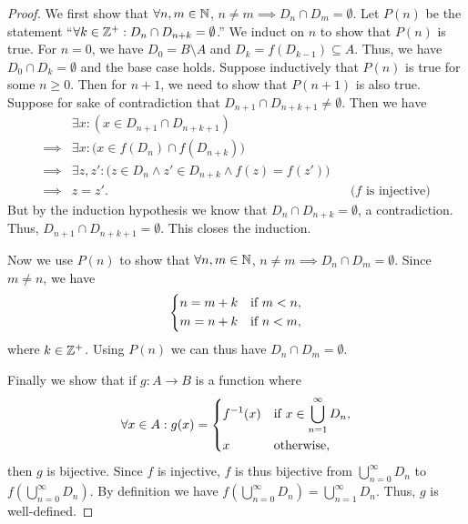 \begin{proof}
  We first show that \(\forall n, m \in \mathbb{N}\), \(n \neq m \implies D_n \cap D_m = \emptyset\).
  Let \(P(n)\) be the statement ``\(\forall k \in \mathbb{Z}^+ : D_n \cap D_{n + k} = \emptyset\).''
  We induct on \(n\) to show that \(P(n)\) is true.
  For \(n = 0\), we have \(D_0 = B \setminus A\) and \(D_k = f(D_{k - 1}) \subseteq A\).
  Thus, we have \(D_0 \cap D_k = \emptyset\) and the base case holds.
  Suppose inductively that \(P(n)\) is true for some \(n \geq 0\).
  Then for \(n + 1\), we need to show that \(P(n + 1)\) is also true.
  Suppose for sake of contradiction that \(D_{n + 1} \cap D_{n + k + 1} \neq \emptyset\).
  Then we have
  \begin{align*}
             & \exists x : (x \in D_{n + 1} \cap D_{n + k + 1})                                                               \\
    \implies & \exists x : \big(x \in f(D_n) \cap f(D_{n + k})\big)                                                           \\
    \implies & \exists z, z' : \big(z \in D_n \land z' \in D_{n + k} \land f(z) = f(z')\big)                                  \\
    \implies & z = z'.                                                                       &  & \text{(\(f\) is injective)}
  \end{align*}
  But by the induction hypothesis we know that \(D_n \cap D_{n + k} = \emptyset\), a contradiction.
  Thus, \(D_{n + 1} \cap D_{n + k + 1} = \emptyset\).
  This closes the induction.

  Now we use \(P(n)\) to show that \(\forall n, m \in \mathbb{N}\), \(n \neq m \implies D_n \cap D_m = \emptyset\).
  Since \(m \neq n\), we have
  \[
    \begin{dcases}
      n = m + k & \text{if } m < n, \\
      m = n + k & \text{if } n < m,
    \end{dcases}
  \]
  where \(k \in \mathbb{Z}^+\).
  Using \(P(n)\) we can thus have \(D_n \cap D_m = \emptyset\).

  Finally we show that if \(g : A \to B\) is a function where
  \[
    \forall x \in A : g(x) = \begin{dcases}
      f^{-1}(x) & \text{if } x \in \bigcup_{n = 1}^\infty D_n, \\
      x         & \text{otherwise},
    \end{dcases}
  \]
  then \(g\) is bijective.
  Since \(f\) is injective, \(f\) is thus bijective from \(\bigcup_{n = 0}^\infty D_n\) to \(f(\bigcup_{n = 0}^\infty D_n)\).
  By definition we have \(f(\bigcup_{n = 0}^\infty D_n) = \bigcup_{n = 1}^\infty D_n\).
  Thus, \(g\) is well-defined.


\end{proof}
